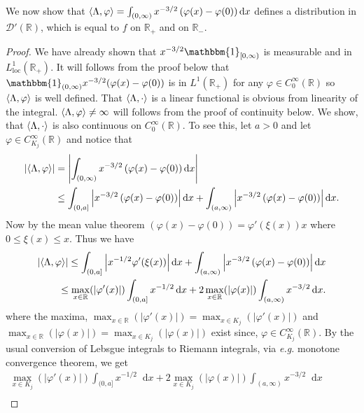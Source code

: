 \documentclass[a4paper,11pt]{article}
\newcommand{\abs}[1]{\left\lvert #1 \right\rvert}
\newcommand*\diff{\mathop{}\!\mathrm{d}}
\newcommand{\eg}{\emph{e.g.} }
\newcommand{\R}{\mathbb{R}}
\newcommand{\loc}{\text{loc}}
\numberwithin{equation}{section}
\begin{document}
We now show that $ \braket{\Lambda,\varphi}=\int_{(0,\infty)}x^{-3/2}\left(\varphi(x)-\varphi(0)\right) \diff x$ defines a distribution in $ \mathcal{D}'(\R) $, which is equal to $ f $ on $ \R_+ $ and on $ \R_- $. \begin{proof}
	We have already shown that $ x^{-3/2}\mathbbm{1}_{[0,\infty)} $ is measurable and in $ L^1_{\loc}(\R_+) $. It will follows from the proof below that $ \mathbbm{1}_{(0,\infty)}x^{-3/2}(\varphi(x)-\varphi(0)) $ is in $ L^1(\R_+) $ for any $ \varphi\in C^\infty_0(\R) $ so $ \braket{\Lambda,\varphi} $ is well defined.  That $ \braket{\Lambda,\cdot} $ is a linear functional is obvious from linearity of the integral. $ \braket{\Lambda,\varphi}\neq\infty $ will follows from the proof of continuity below. We show, that $ \braket{\Lambda,\cdot} $ is also continuous on $ C^\infty_0(\R) $. To see this, let $ a>0 $ and let $ \varphi\in C_{K_j}^\infty(\R) $ and notice that \begin{equation}
\begin{aligned}
	\abs{\braket{\Lambda,\varphi}}&=\abs{\int_{(0,\infty)}x^{-3/2}\left(\varphi(x)-\varphi(0)\right)\diff x}\\&\leq\int_{(0,a]}\abs{x^{-3/2}\left(\varphi(x)-\varphi(0)\right)}\diff x+\int_{(a,\infty)}\abs{x^{-3/2}\left(\varphi(x)-\varphi(0)\right)}\diff x.
\end{aligned}
	\end{equation}
	Now by the mean value theorem $ \left(\varphi(x)-\varphi(0)\right)=\varphi'(\xi(x))x $ where $ 0\leq \xi(x)\leq x $. Thus we have \begin{equation}
	\begin{aligned}
	\abs{\braket{\Lambda,\varphi}}\leq\int_{(0,a]}\abs{x^{-1/2}\varphi'(\xi(x))}\diff x+\int_{(a,\infty)}\abs{x^{-3/2}\left(\varphi(x)-\varphi(0)\right)}\diff x\\
	\leq \max_{x\in \R }(\abs{\varphi'(x)})\int_{(0,a]} x^{-1/2}\diff x+2\max_{x\in \R }(\abs{\varphi(x)})\int_{(a,\infty)} x^{-3/2}\diff x.
	\end{aligned}
	\end{equation}
	where the maxima, $ \max_{x\in \R}(\abs{\varphi'(x)})=\max_{x\in K_j }(\abs{\varphi'(x)}) $ and $ \max_{x\in \R }(\abs{\varphi(x)})=\max_{x\in K_j }(\abs{\varphi(x)}) $ exist since, $ \varphi \in C^{\infty}_{K_j}(\R) $. By the usual conversion of Lebsgue integrals to Riemann integrals, via \eg monotone convergence theorem, we get \begin{equation}
	\begin{aligned}
	\max_{x\in K_j }(\abs{\varphi'(x)})\int_{(0,a]} x^{-1/2}\diff x+2\max_{x\in K_j}(\abs{\varphi(x)})\int_{(a,\infty)} x^{-3/2}\diff x\qquad\qquad\qquad\qquad\qquad\qquad\\

\end{aligned}
\end{equation}
\end{proof}
\end{document}
